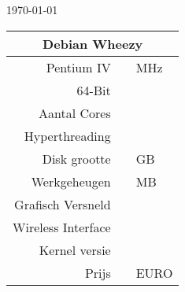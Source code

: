 \documentclass[a4paper,14pt]{extarticle}
\begin{document}
\centerline{\today}
\vskip 0.5cm
\begin{center}
\begin{tabular}{ |r| r| l| }
	\multicolumn{3}{c}{\Huge{Debian Wheezy \debianversion}}\\
	\hline
	Pentium IV & \cpuspeed{} & MHz \\
	64-Bit & \bitssixtyfour{} & \\
	Aantal Cores & \corecount{} & \\
	Hyperthreading & \hyperthreading{} & \\
	Disk grootte & \disksize{} & GB \\
	Werkgeheugen & \memsize{} & MB \\
	Grafisch Versneld & \accelerated{} & \\
	Wireless Interface & \wireless & \\
	Kernel versie & {} & \\
	Prijs		& \price{} & EURO \\
	\hline
\end{tabular}
\end{center}
\end{document}
